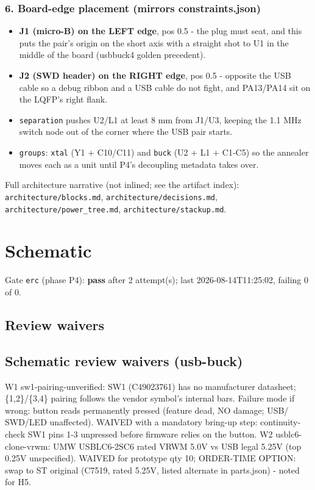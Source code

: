 \documentclass[11pt,a4paper]{article}
\begin{document}
\subsubsection*{6. Board-edge placement (mirrors constraints.json)}
\begin{itemize}
\item \textbf{J1 (micro-B) on the LEFT edge}, pos 0.5 - the plug must seat, and this
puts the pair's origin on the short axis with a straight shot to U1 in the
middle of the board (usbbuck4 golden precedent).
\item \textbf{J2 (SWD header) on the RIGHT edge}, pos 0.5 - opposite the USB cable so
a debug ribbon and a USB cable do not fight, and PA13/PA14 sit on the
LQFP's right flank.
\item \texttt{separation} pushes U2/L1 at least 8 mm from J1/U3, keeping the 1.1 MHz
switch node out of the corner where the USB pair starts.
\item \texttt{groups}: \texttt{xtal} (Y1 + C10/C11) and \texttt{buck} (U2 + L1 + C1-C5) so the
annealer moves each as a unit until P4's decoupling metadata takes over.
\end{itemize}
Full architecture narrative (not inlined; see the artifact index): \texttt{architecture/blocks.md}, \texttt{architecture/decisions.md}, \texttt{architecture/power\_tree.md}, \texttt{architecture/stackup.md}.
\section{Schematic}
Gate \texttt{erc} (phase P4): \textbf{pass} after 2 attempt(s); last 2026-08-14T11:25:02, failing 0 of 0.
\subsection*{Review waivers}
\subsection*{Schematic review waivers (usb-buck)}
W1 sw1-pairing-unverified: SW1 (C49023761) has no manufacturer datasheet; \{1,2\}/\{3,4\} pairing follows the vendor symbol's internal bars. Failure mode if wrong: button reads permanently pressed (feature dead, NO damage; USB/ SWD/LED unaffected). WAIVED with a mandatory bring-up step: continuity-check SW1 pins 1-3 unpressed before firmware relies on the button. W2 usblc6-clone-vrwm: UMW USBLC6-2SC6 rated VRWM 5.0V vs USB legal 5.25V (top 0.25V unspecified). WAIVED for prototype qty 10; ORDER-TIME OPTION: swap to ST original (C7519, rated 5.25V, listed alternate in parts.json) - noted for H5.
\end{document}
